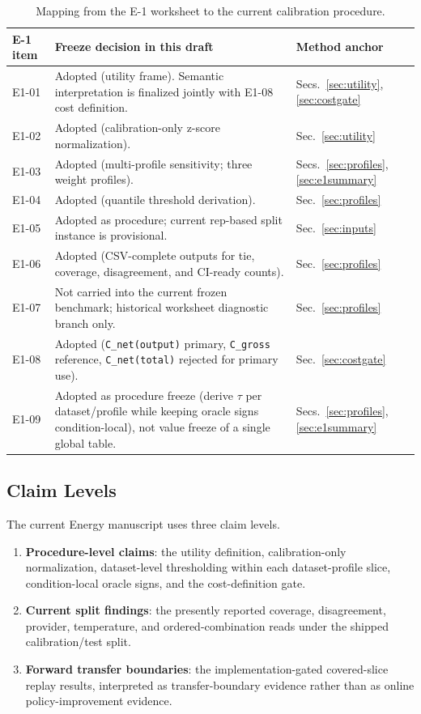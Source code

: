 \documentclass[11pt,a4paper]{article}
\begin{document}
\begin{table}[ht]
\centering
\small
\begin{tabularx}{\textwidth}{@{}lXl@{}}
\toprule
E-1 item & Freeze decision in this draft & Method anchor \\
\midrule
E1-01 & Adopted (utility frame). Semantic interpretation is finalized jointly with E1-08 cost definition. & Secs.~\ref{sec:utility}, \ref{sec:costgate} \\
E1-02 & Adopted (calibration-only z-score normalization). & Sec.~\ref{sec:utility} \\
E1-03 & Adopted (multi-profile sensitivity; three weight profiles). & Secs.~\ref{sec:profiles}, \ref{sec:e1summary} \\
E1-04 & Adopted (quantile threshold derivation). & Sec.~\ref{sec:profiles} \\
E1-05 & Adopted as procedure; current rep-based split instance is provisional. & Sec.~\ref{sec:inputs} \\
E1-06 & Adopted (CSV-complete outputs for tie, coverage, disagreement, and CI-ready counts). & Sec.~\ref{sec:profiles} \\
E1-07 & Not carried into the current frozen benchmark; historical worksheet diagnostic branch only. & Sec.~\ref{sec:profiles} \\
E1-08 & Adopted (\texttt{C\_net(output)} primary, \texttt{C\_gross} reference, \texttt{C\_net(total)} rejected for primary use). & Sec.~\ref{sec:costgate} \\
E1-09 & Adopted as procedure freeze (derive $\tau$ per dataset/profile while keeping oracle signs condition-local), not value freeze of a single global table. & Secs.~\ref{sec:profiles}, \ref{sec:e1summary} \\
\bottomrule
\end{tabularx}
\caption{Mapping from the E-1 worksheet to the current calibration procedure.}
\label{tab:e1_map}
\end{table}

\subsection{Claim Levels}
\label{sec:claimlevels}

The current Energy manuscript uses three claim levels.
\begin{enumerate}
  \item \textbf{Procedure-level claims}: the utility definition, calibration-only normalization, dataset-level thresholding within each dataset-profile slice, condition-local oracle signs, and the cost-definition gate.
  \item \textbf{Current split findings}: the presently reported coverage, disagreement, provider, temperature, and ordered-combination reads under the shipped calibration/test split.
  \item \textbf{Forward transfer boundaries}: the implementation-gated covered-slice replay results, interpreted as transfer-boundary evidence rather than as online policy-improvement evidence.
\end{enumerate}
\end{document}
